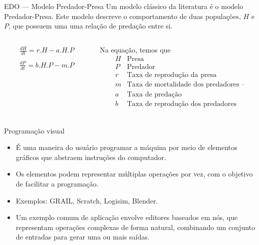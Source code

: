\begin{frame}{EDO — Modelo Predador-Presa}
    Um modelo clássico da literatura é o modelo Predador-Presa. Este modelo descreve o comportamento de duas populações, $H$ e $P$, que possuem uma uma relação de predação entre si. 

    \begin{columns}
        \begin{column}{.3\textwidth}
            \begin{equation}\label{eq:predadorpresa}
                \begin{array}{lr}
                    \frac{dH}{dt} = r.H - a.H.P
                    \\
                    \\
                    \frac{dP}{dt} = b.H.P - m.P
                \end{array}
            \end{equation}
        \end{column}
        \begin{column}{.6\textwidth}
            Na equação, temos que
            \[
            \begin{array}{lr}
                H & \text{Presa}\\
                P & \text{Predador}\\
                r & \text{Taxa de reprodução da presa}\\
                m & \text{Taxa de mortalidade dos predadores}\\
                a & \text{Taxa de predação}\\
                b & \text{Taxa de reprodução dos predadores}\\
                \end{array}.
            \]
        \end{column}
    \end{columns}

\end{frame}
    
\begin{frame}{Programação visual}
    \begin{itemize}
        \item É uma maneira do usuário programar a máquina por meio de elementos gráficos que abstraem instruções do computador.
        \item Os elementos podem representar múltiplas operações por vez, com o objetivo de facilitar a programação.
        \item Exemplos: GRAIL, Scratch, Logisim, Blender. 
        \item Um exemplo comum de aplicação envolve editores baseados em nós, que representam operações complexas de forma natural, combinando um conjunto de entradas para gerar uma ou mais saídas.
    \end{itemize}
\end{frame}

